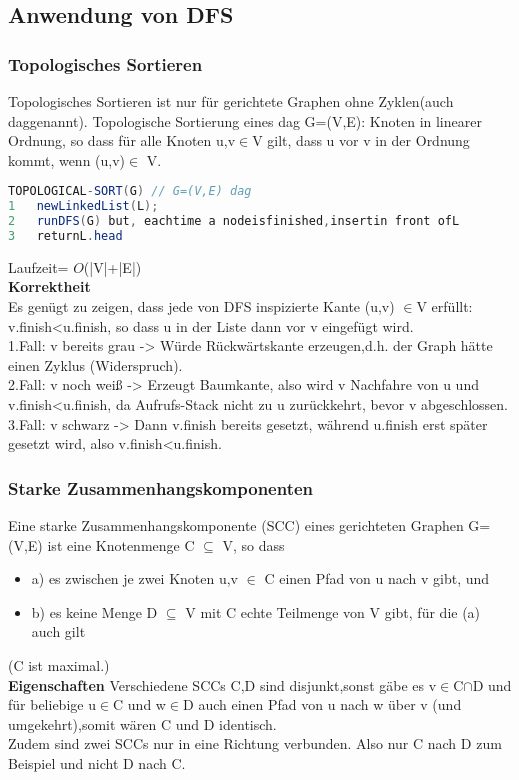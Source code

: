 \documentclass[jou,apacite]{apa6}
\begin{document}
\subsection{Anwendung von DFS}
\subsubsection{Topologisches Sortieren}
Topologisches Sortieren ist nur für gerichtete Graphen ohne Zyklen(auch \dq dag\dq  genannt). Topologische Sortierung eines dag G=(V,E): Knoten in linearer Ordnung, so dass für alle Knoten u,v$\in$V gilt, dass u vor v in der Ordnung kommt, wenn (u,v)$\in$ V.
\begin{lstlisting}[language=java]
TOPOLOGICAL-SORT(G) // G=(V,E) dag
1   newLinkedList(L);
2   runDFS(G) but, eachtime a nodeisfinished,insertin front ofL 
3   returnL.head
\end{lstlisting}
Laufzeit= $O$(|V|+|E|)\\
{\bfseries Korrektheit }\\ 
Es genügt zu zeigen, dass jede von DFS inspizierte Kante (u,v) $\in$V erfüllt: v.finish<u.finish, so dass u in der Liste dann vor v eingefügt wird.\\
1.Fall: v bereits grau -> Würde Rückwärtskante erzeugen,d.h. der Graph hätte einen Zyklus (Widerspruch). \\
2.Fall: v noch weiß -> Erzeugt Baumkante, also wird v Nachfahre von u und v.finish<u.finish, da Aufrufs-Stack nicht zu u zurückkehrt, bevor v abgeschlossen. \\
3.Fall: v schwarz -> Dann v.finish bereits gesetzt, während u.finish erst später gesetzt wird, also v.finish<u.finish.\\

\subsubsection{Starke Zusammenhangskomponenten}
Eine starke Zusammenhangskomponente (SCC) eines gerichteten Graphen G=(V,E) ist eine Knotenmenge C $\subseteq$ V, 
so dass\\
\begin{itemize}
    \item a) es zwischen je zwei Knoten u,v $\in$ C einen Pfad von u nach v gibt, und 
    \item b) es keine Menge D $\subseteq$ V mit C echte Teilmenge von V gibt, für die (a) auch gilt
\end{itemize}
(C ist maximal.)\\
{\bfseries Eigenschaften}
Verschiedene SCCs C,D sind disjunkt,sonst gäbe es  v$\in$C$\cap$D und für beliebige  u$\in$C und  w$\in$D auch einen Pfad von u nach w über v (und umgekehrt),somit wären C und D identisch.\\
Zudem sind zwei SCCs nur in eine Richtung verbunden. Also nur C nach D zum Beispiel und nicht D nach C.\\
\end{document}
